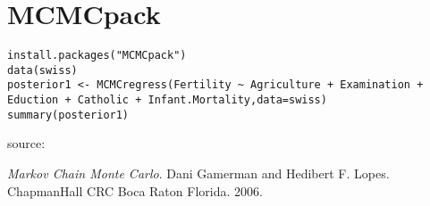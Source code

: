 \documentclass{article}
\begin{document}
\section{MCMCpack}
\begin{verbatim}
install.packages("MCMCpack")
data(swiss)
posterior1 <- MCMCregress(Fertility ~ Agriculture + Examination + Eduction + Catholic + Infant.Mortality,data=swiss)
summary(posterior1)
\end{verbatim}
source:

\emph{Markov Chain Monte Carlo}. Dani Gamerman and Hedibert F. Lopes.
ChapmanHall CRC Boca Raton Florida. 2006.
\end{document}
